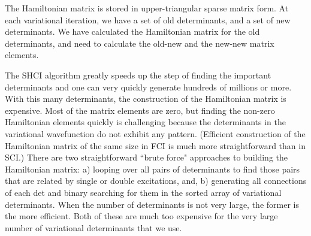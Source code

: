 \documentclass[%
reprint,
 superscriptaddress,
 amsmath,amssymb,
 aps,
]{revtex4-1}
\begin{document}
The Hamiltonian matrix is stored in upper-triangular sparse matrix form.
At each variational iteration, we have a set of old determinants, and a set of new determinants.
We have calculated the Hamiltonian matrix for the old determinants, and need to calculate the old-new and the new-new
matrix elements.

The SHCI algorithm greatly speeds up the step of finding the important determinants and one can very quickly generate
hundreds of millions or more.  With this many determinants, the construction of the Hamiltonian matrix is expensive.
Most of the matrix elements are zero, but finding the non-zero Hamiltonian elements quickly is challenging because
the determinants in the variational wavefunction do not exhibit any pattern.
(Efficient construction of the Hamiltonian matrix of the same size in FCI is much more straightforward than in SCI.)
There are two straightforward ``brute force" approaches to building the Hamiltonian matrix:
a) looping over all pairs of determinants to find those pairs that are related by single or double excitations, and, b)
generating all connections of each det and binary searching for them in the sorted array of variational determinants.
When the number of determinants is not very large, the former is the more efficient.
Both of these are much too expensive for the very large number of variational determinants that we use.
\end{document}
